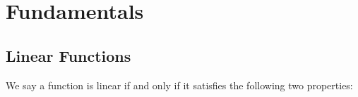 \chapter{Fundamentals}
\section{Linear Functions}
We say a function is linear if and only if it satisfies the following two properties:

